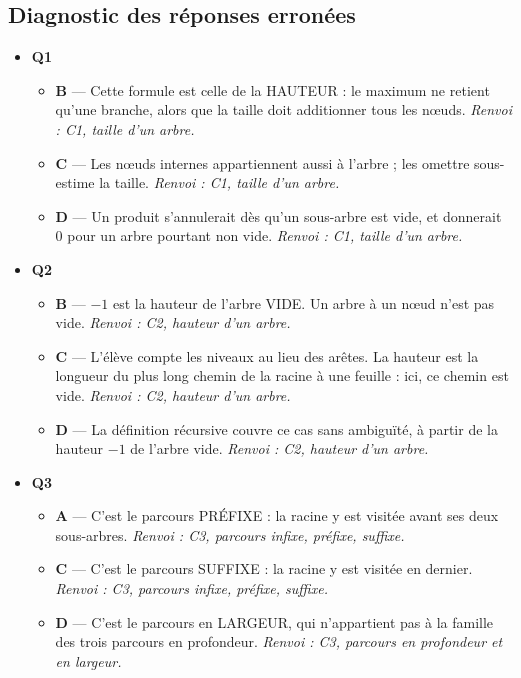 \subsection*{Diagnostic des réponses erronées}

\begin{itemize}
  \item \textbf{Q1}
  \begin{itemize}
    \item \textbf{B} — Cette formule est celle de la HAUTEUR : le maximum ne retient qu'une branche, alors que la taille doit additionner tous les nœuds. \emph{Renvoi : C1, taille d'un arbre.}
    \item \textbf{C} — Les nœuds internes appartiennent aussi à l'arbre ; les omettre sous-estime la taille. \emph{Renvoi : C1, taille d'un arbre.}
    \item \textbf{D} — Un produit s'annulerait dès qu'un sous-arbre est vide, et donnerait $0$ pour un arbre pourtant non vide. \emph{Renvoi : C1, taille d'un arbre.}
  \end{itemize}
  \item \textbf{Q2}
  \begin{itemize}
    \item \textbf{B} — $-1$ est la hauteur de l'arbre VIDE. Un arbre à un nœud n'est pas vide. \emph{Renvoi : C2, hauteur d'un arbre.}
    \item \textbf{C} — L'élève compte les niveaux au lieu des arêtes. La hauteur est la longueur du plus long chemin de la racine à une feuille : ici, ce chemin est vide. \emph{Renvoi : C2, hauteur d'un arbre.}
    \item \textbf{D} — La définition récursive couvre ce cas sans ambiguïté, à partir de la hauteur $-1$ de l'arbre vide. \emph{Renvoi : C2, hauteur d'un arbre.}
  \end{itemize}
  \item \textbf{Q3}
  \begin{itemize}
    \item \textbf{A} — C'est le parcours PRÉFIXE : la racine y est visitée avant ses deux sous-arbres. \emph{Renvoi : C3, parcours infixe, préfixe, suffixe.}
    \item \textbf{C} — C'est le parcours SUFFIXE : la racine y est visitée en dernier. \emph{Renvoi : C3, parcours infixe, préfixe, suffixe.}
    \item \textbf{D} — C'est le parcours en LARGEUR, qui n'appartient pas à la famille des trois parcours en profondeur. \emph{Renvoi : C3, parcours en profondeur et en largeur.}

\end{itemize}
\end{itemize}

